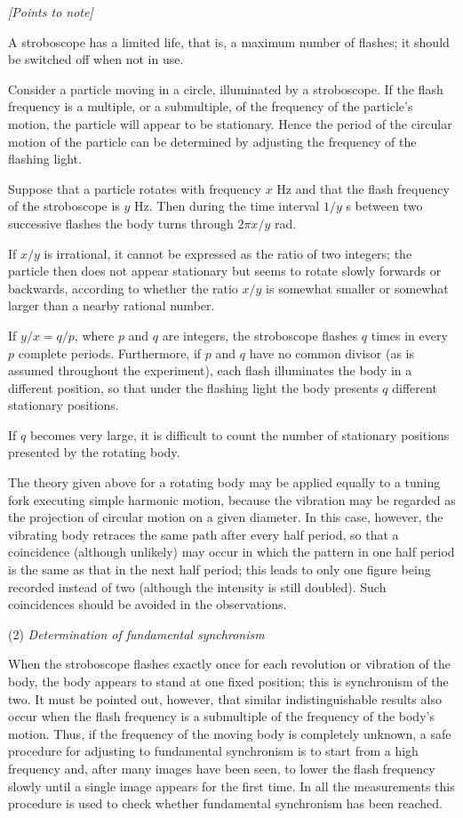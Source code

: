 \noindent\textit{[Points to note]}

A stroboscope has a limited life, that is, a maximum number of flashes; it should be switched off when not in use.

Consider a particle moving in a circle, illuminated by a stroboscope. If the flash frequency is a multiple, or a submultiple, of the frequency of the particle's motion, the particle will appear to be stationary. Hence the period of the circular motion of the particle can be determined by adjusting the frequency of the flashing light.

Suppose that a particle rotates with frequency $x$ Hz and that the flash frequency of the stroboscope is $y$ Hz. Then during the time interval $1/y$ s between two successive flashes the body turns through $2\pi x/y$ rad.

If $x/y$ is irrational, it cannot be expressed as the ratio of two integers; the particle then does not appear stationary but seems to rotate slowly forwards or backwards, according to whether the ratio $x/y$ is somewhat smaller or somewhat larger than a nearby rational number.

If $y/x=q/p$, where $p$ and $q$ are integers, the stroboscope flashes $q$ times in every $p$ complete periods. Furthermore, if $p$ and $q$ have no common divisor (as is assumed throughout the experiment), each flash illuminates the body in a different position, so that under the flashing light the body presents $q$ different stationary positions.

If $q$ becomes very large, it is difficult to count the number of stationary positions presented by the rotating body.

The theory given above for a rotating body may be applied equally to a tuning fork executing simple harmonic motion, because the vibration may be regarded as the projection of circular motion on a given diameter. In this case, however, the vibrating body retraces the same path after every half period, so that a coincidence (although unlikely) may occur in which the pattern in one half period is the same as that in the next half period; this leads to only one figure being recorded instead of two (although the intensity is still doubled). Such coincidences should be avoided in the observations.

(2) \textit{Determination of fundamental synchronism}

When the stroboscope flashes exactly once for each revolution or vibration of the body, the body appears to stand at one fixed position; this is synchronism of the two. It must be pointed out, however, that similar indistinguishable results also occur when the flash frequency is a submultiple of the frequency of the body's motion. Thus, if the frequency of the moving body is completely unknown, a safe procedure for adjusting to fundamental synchronism is to start from a high frequency and, after many images have been seen, to lower the flash frequency slowly until a single image appears for the first time. In all the measurements this procedure is used to check whether fundamental synchronism has been reached.

